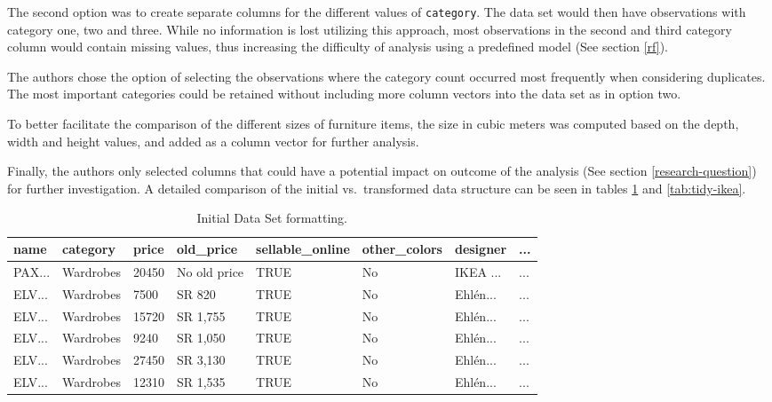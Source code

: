 \documentclass[a4paper, nobind]{templates/ociamthesis}
\begin{document}
The second option was to create separate columns for the different values of \texttt{category}. The data set would then have observations with category one, two and three. While no information is lost utilizing this approach, most observations in the second and third category column would contain missing values, thus increasing the difficulty of analysis using a predefined model (See section \ref{rf}).

The authors chose the option of selecting the observations where the category count occurred most frequently when considering duplicates. The most important categories could be retained without including more column vectors into the data set as in option two.

To better facilitate the comparison of the different sizes of furniture items, the size in cubic meters was computed based on the depth, width and height values, and added as a column vector for further analysis.

Finally, the authors only selected columns that could have a potential impact on outcome of the analysis (See section \ref{research-question}) for further investigation. A detailed comparison of the initial vs.~transformed data structure can be seen in tables \ref{tab:initial-ikea} and \ref{tab:tidy-ikea}.

\begin{table}

\caption{\label{tab:initial-ikea}Initial Data Set formatting.}
\centering
\fontsize{8}{10}\selectfont
\begin{tabular}[t]{l|l|l|l|l|l|l|l}
\hline
name & category & price & old\_price & sellable\_online & other\_colors & designer & ...\\
\hline
PAX... & Wardrobes & 20450 & No old price & TRUE & No & IKEA ... & ...\\
\hline
ELV... & Wardrobes & 7500 & SR 820 & TRUE & No & Ehlén... & ...\\
\hline
ELV... & Wardrobes & 15720 & SR 1,755 & TRUE & No & Ehlén... & ...\\
\hline
ELV... & Wardrobes & 9240 & SR 1,050 & TRUE & No & Ehlén... & ...\\
\hline
ELV... & Wardrobes & 27450 & SR 3,130 & TRUE & No & Ehlén... & ...\\
\hline
ELV... & Wardrobes & 12310 & SR 1,535 & TRUE & No & Ehlén... & ...\\
\hline
\end{tabular}
\end{table}
\end{document}
